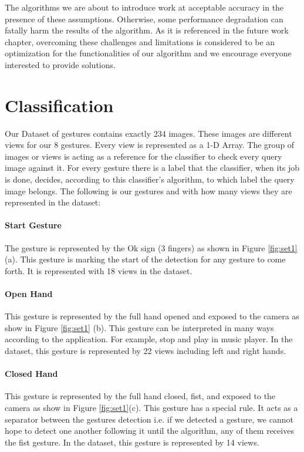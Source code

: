 The algorithms we are about to introduce work at acceptable accuracy in the presence of these assumptions. Otherwise, some performance degradation can fatally harm the results of the algorithm. As it is referenced in the future work chapter, overcoming these challenges and limitations is considered to be an optimization for the functionalities of our algorithm and we encourage everyone interested to provide solutions. 
\bigskip


\section{Classification} 
Our Dataset of gestures contains exactly 234 images. These images are different views for our 8 gestures. Every view is represented as a 1-D Array. The group of images or views is acting as a reference for the classifier to check every query image against it. For every gesture there is a label that the classifier, when its job is done, decides, according to this classifier's algorithm, to which label the query image belongs. The following is our gestures and with how many views they are represented in the dataset:

\paragraph{Start Gesture}
The gesture is represented by the Ok sign (3 fingers) as shown in Figure \ref{fig:set1} (a). This gesture is marking the start of the detection for any gesture to come forth. It is represented with 18 views in the dataset.

\paragraph{Open Hand}
This gesture is represented by the full hand opened and exposed to the camera as show in Figure \ref{fig:set1} (b). This gesture can be interpreted in many ways according to the application. For example, stop and play in music player. In the dataset, this gesture is represented by 22 views including left and right hands.

\paragraph{Closed Hand}
This gesture is represented by the full hand closed, fist, and exposed to the camera as show in Figure \ref{fig:set1}(c). This gesture has a special rule. It acts as a separator between the gestures detection i.e. if we detected a gesture, we cannot hope to detect one another following it until the algorithm, any of them receives the fist gesture. In the dataset, this gesture is represented by 14 views.

